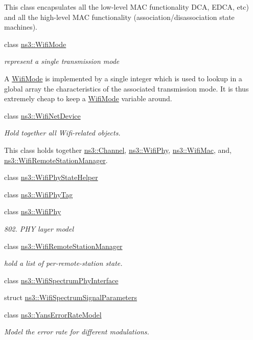 \begin{DoxyCompactItemize}
\begin{DoxyCompactList}
This class encapsulates all the low-\/level M\+AC functionality D\+CA, E\+D\+CA, etc) and all the high-\/level M\+AC functionality (association/disassociation state machines). \end{DoxyCompactList}\item 
class \hyperlink{classns3_1_1WifiMode}{ns3\+::\+Wifi\+Mode}
\begin{DoxyCompactList}\small\item\em represent a single transmission mode

A \hyperlink{classns3_1_1WifiMode}{Wifi\+Mode} is implemented by a single integer which is used to lookup in a global array the characteristics of the associated transmission mode. It is thus extremely cheap to keep a \hyperlink{classns3_1_1WifiMode}{Wifi\+Mode} variable around. \end{DoxyCompactList}\item 
class \hyperlink{classns3_1_1WifiNetDevice}{ns3\+::\+Wifi\+Net\+Device}
\begin{DoxyCompactList}\small\item\em Hold together all Wifi-\/related objects.

This class holds together \hyperlink{classns3_1_1Channel}{ns3\+::\+Channel}, \hyperlink{classns3_1_1WifiPhy}{ns3\+::\+Wifi\+Phy}, \hyperlink{classns3_1_1WifiMac}{ns3\+::\+Wifi\+Mac}, and, \hyperlink{classns3_1_1WifiRemoteStationManager}{ns3\+::\+Wifi\+Remote\+Station\+Manager}. \end{DoxyCompactList}\item 
class \hyperlink{classns3_1_1WifiPhyStateHelper}{ns3\+::\+Wifi\+Phy\+State\+Helper}
\item 
class \hyperlink{classns3_1_1WifiPhyTag}{ns3\+::\+Wifi\+Phy\+Tag}
\item 
class \hyperlink{classns3_1_1WifiPhy}{ns3\+::\+Wifi\+Phy}
\begin{DoxyCompactList}\small\item\em 802. P\+HY layer model \end{DoxyCompactList}\item 
class \hyperlink{classns3_1_1WifiRemoteStationManager}{ns3\+::\+Wifi\+Remote\+Station\+Manager}
\begin{DoxyCompactList}\small\item\em hold a list of per-\/remote-\/station state. \end{DoxyCompactList}\item 
class \hyperlink{classns3_1_1WifiSpectrumPhyInterface}{ns3\+::\+Wifi\+Spectrum\+Phy\+Interface}
\item 
struct \hyperlink{structns3_1_1WifiSpectrumSignalParameters}{ns3\+::\+Wifi\+Spectrum\+Signal\+Parameters}
\item 
class \hyperlink{classns3_1_1YansErrorRateModel}{ns3\+::\+Yans\+Error\+Rate\+Model}
\begin{DoxyCompactList}\small\item\em Model the error rate for different modulations.


\end{DoxyCompactList}
\end{DoxyCompactItemize}
